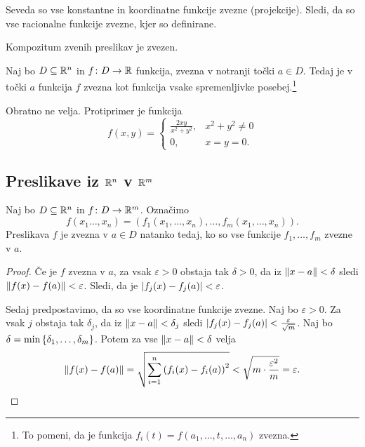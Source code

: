 \obvs

\begin{opomba}
Seveda so vse konstantne in koordinatne funkcije zvezne (projekcije). Sledi, da so vse racionalne funkcije zvezne, kjer so definirane.
\end{opomba}

\begin{opomba}
Kompozitum zvenih preslikav je zvezen.
\end{opomba}


\begin{izrek}
Naj bo $D\subseteq\mathbb{R}^n$ in $f\colon D\to\mathbb{R}$ funkcija, zvezna v notranji točki $a\in D$. Tedaj je v točki $a$ funkcija $f$ zvezna kot funkcija vsake spremenljivke posebej.\footnote{To pomeni, da je funkcija $f_i(t)=f(a_1,\dots,t,\dots,a_n)$ zvezna.}
\end{izrek}

\obvs

\begin{opomba}
Obratno ne velja. Protiprimer je funkcija
\[
f(x,y)=\begin{cases}
\frac{2xy}{x^2+y^2},& x^2+y^2\ne 0 \\
0,& x=y=0.
\end{cases}
\]
\end{opomba}

\newpage

\subsection{Preslikave iz $\mathbb{R}^n$ v $\mathbb{R}^m$}

\begin{trditev}
Naj bo $D\subseteq\mathbb{R}^n$ in $f\colon D\to\mathbb{R}^m$. Označimo
\[
f(x_1\dots,x_n)=\left(f_1(x_1,\dots,x_n),\dots,f_m(x_1,\dots,x_n)\right).
\]
Preslikava $f$ je zvezna v $a\in D$ natanko tedaj, ko so vse funkcije $f_1,\dots,f_m$ zvezne v $a$.
\end{trditev}

\begin{proof}
Če je $f$ zvezna v $a$, za vsak $\varepsilon>0$ obstaja tak $\delta>0$, da iz $\left\lVert x-a\right\rVert<\delta$ sledi $\left\lVert f(x)-f(a)\right\rVert<\varepsilon$. Sledi, da je $\left\lvert f_j(x)-f_j(a)\right\rvert<\varepsilon$.

Sedaj predpostavimo, da so vse koordinatne funkcije zvezne. Naj bo $\varepsilon>0$. Za vsak $j$ obstaja tak $\delta_j$, da iz $\left\lVert x-a\right\rVert<\delta_j$ sledi $\left\lvert f_j(x)-f_j(a)\right\rvert<\frac{\varepsilon}{\sqrt{m}}$. Naj bo $\delta=\min\left\{\delta_1,\dots,\delta_m\right\}$. Potem za vse $\left\lVert x-a\right\rVert<\delta$ velja
\[
\left\lVert f(x)-f(a)\right\rVert=\sqrt{\sum_{i=1}^n\left(f_i(x)-f_i(a)\right)^2}<\sqrt{m\cdot\frac{\varepsilon^2}{m}}=\varepsilon.\qedhere
\]
\end{proof}

